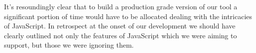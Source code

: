 \documentclass[conference]{IEEEtran}
\begin{document}
It's resoundingly clear that to build a production grade version of our tool
a significant portion of time would have to be allocated dealing with the
intricacies of JavaScript. In retrospect at the onset of our development we
should have clearly outlined not only the features of JavaScript which we
were aiming to support, but those we were ignoring them.




%
%



%
%
\end{document}
